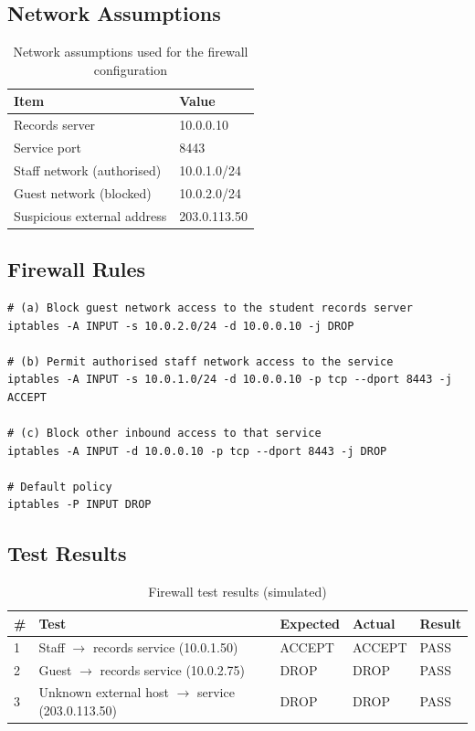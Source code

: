 \documentclass[11pt,a4paper]{article}
\begin{document}
\subsection{Network Assumptions}

\begin{table}[h]
\centering
\begin{tabular}{p{6cm}p{6cm}}
\toprule
\textbf{Item} & \textbf{Value} \\
\midrule
Records server & 10.0.0.10 \\
Service port & 8443 \\
Staff network (authorised) & 10.0.1.0/24 \\
Guest network (blocked) & 10.0.2.0/24 \\
Suspicious external address & 203.0.113.50 \\
\bottomrule
\end{tabular}
\caption{Network assumptions used for the firewall configuration}
\end{table}

\subsection{Firewall Rules}

\begin{lstlisting}
# (a) Block guest network access to the student records server
iptables -A INPUT -s 10.0.2.0/24 -d 10.0.0.10 -j DROP

# (b) Permit authorised staff network access to the service
iptables -A INPUT -s 10.0.1.0/24 -d 10.0.0.10 -p tcp --dport 8443 -j ACCEPT

# (c) Block other inbound access to that service
iptables -A INPUT -d 10.0.0.10 -p tcp --dport 8443 -j DROP

# Default policy
iptables -P INPUT DROP
\end{lstlisting}

\subsection{Test Results}

\begin{table}[h]
\centering
\begin{tabular}{p{0.5cm}p{5cm}p{2cm}p{2cm}p{1.5cm}}
\toprule
\textbf{\#} & \textbf{Test} & \textbf{Expected} & \textbf{Actual} & \textbf{Result} \\
\midrule
1 & Staff $\rightarrow$ records service (10.0.1.50) & ACCEPT & ACCEPT & PASS \\
2 & Guest $\rightarrow$ records service (10.0.2.75) & DROP & DROP & PASS \\
3 & Unknown external host $\rightarrow$ service (203.0.113.50) & DROP & DROP & PASS \\
\bottomrule
\end{tabular}
\caption{Firewall test results (simulated)}
\end{table}
\end{document}
